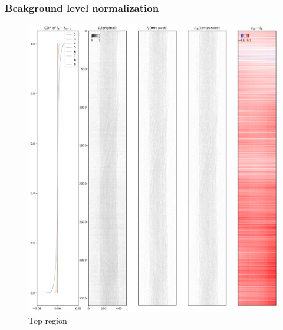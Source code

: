 \documentclass[12pt]{scrartcl}
\newcommand{\myscale}{1}
\begin{document}
\subsubsection{Bcakground level normalization}\label{sec: bg lv norm}

\renewcommand{\myscale}{0.5}
\begin{figure}
\centering
\includegraphics[scale=\myscale]{sinogramNormalization_top}
\caption{
Top region
}\label{fig: sino norm top}
\end{figure}
\end{document}
